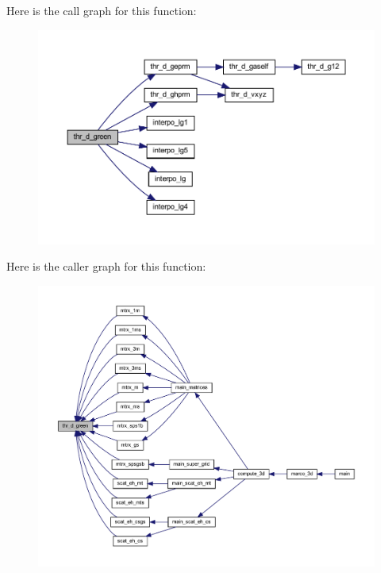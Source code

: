 Here is the call graph for this function\+:
\nopagebreak
\begin{figure}[H]
\begin{center}
\leavevmode
\includegraphics[width=350pt]{Marco_8f90_a0296c656f8f4846170724584ffa24f15_cgraph}
\end{center}
\end{figure}
Here is the caller graph for this function\+:
\nopagebreak
\begin{figure}[H]
\begin{center}
\leavevmode
\includegraphics[width=350pt]{Marco_8f90_a0296c656f8f4846170724584ffa24f15_icgraph}
\end{center}
\end{figure}
\mbox{\label{Marco_8f90_a0db0bc5f77e1fa8016abcd5554c1ae61}} 
